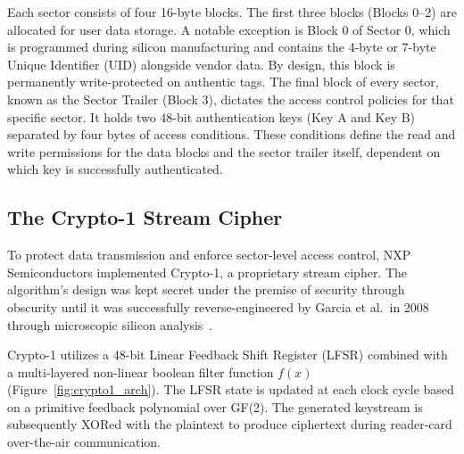 \documentclass[sigconf]{acmart}
\begin{document}
Each sector consists of four 16-byte blocks. The first three blocks (Blocks 0--2) are allocated for user data storage. A notable exception is Block 0 of Sector 0, which is programmed during silicon manufacturing and contains the 4-byte or 7-byte Unique Identifier (UID) alongside vendor data. By design, this block is permanently write-protected on authentic tags. The final block of every sector, known as the Sector Trailer (Block 3), dictates the access control policies for that specific sector. It holds two 48-bit authentication keys (Key A and Key B) separated by four bytes of access conditions. These conditions define the read and write permissions for the data blocks and the sector trailer itself, dependent on which key is successfully authenticated.

\subsection{The Crypto-1 Stream Cipher}

To protect data transmission and enforce sector-level access control, NXP Semiconductors implemented Crypto-1, a proprietary stream cipher. The algorithm's design was kept secret under the premise of security through obscurity until it was successfully reverse-engineered by Garcia et al.\ in 2008 through microscopic silicon analysis~\cite{garcia2008dismantling}.

Crypto-1 utilizes a 48-bit Linear Feedback Shift Register (LFSR) combined with a multi-layered non-linear boolean filter function $f(x)$ (Figure~\ref{fig:crypto1_arch}). The LFSR state is updated at each clock cycle based on a primitive feedback polynomial over GF(2). The generated keystream is subsequently XORed with the plaintext to produce ciphertext during reader-card over-the-air communication.
\end{document}
